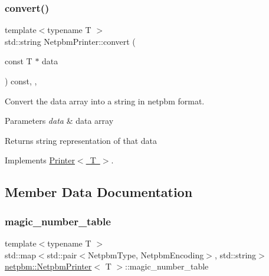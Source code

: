 \subsubsection{\texorpdfstring{convert()}{convert()}}
{\footnotesize\ttfamily template$<$typename T $>$ \\
std\+::string Netpbm\+Printer\+::convert (\begin{DoxyParamCaption}\item[{const T $\ast$}]{data }\end{DoxyParamCaption}) const\hspace{0.3cm}{\ttfamily [override]}, {\ttfamily [protected]}, {\ttfamily [virtual]}}



Convert the data array into a string in netpbm format. 


\begin{DoxyParams}{Parameters}
{\em data} & data array \\
\hline
\end{DoxyParams}
\begin{DoxyReturn}{Returns}
string representation of that data 
\end{DoxyReturn}


Implements \mbox{\hyperlink{class_printer_a18646b8fcd793f222023ea57e3f7353b}{Printer$<$ T $>$}}.



\subsection{Member Data Documentation}
\mbox{\label{classnetpbm_1_1_netpbm_printer_a419b1def194dd1ed47d12299fcc599e3}} 
\subsubsection{\texorpdfstring{magic\_number\_table}{magic\_number\_table}}
{\footnotesize\ttfamily template$<$typename T $>$ \\
std\+::map$<$std\+::pair$<$Netpbm\+Type, Netpbm\+Encoding$>$, std\+::string$>$ \mbox{\hyperlink{classnetpbm_1_1_netpbm_printer}{netpbm\+::\+Netpbm\+Printer}}$<$ T $>$\+::magic\+\_\+number\+\_\+table}

